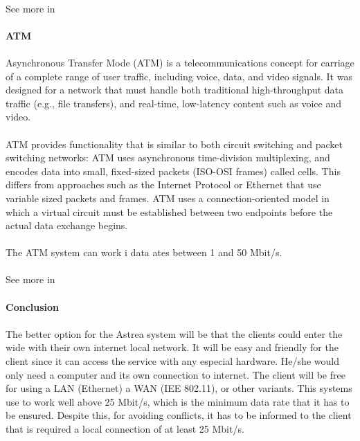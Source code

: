 \paragraph{}
See more in \cite{FrameRelay}

\paragraph{} \textbf{ATM}
\paragraph{} 
Asynchronous Transfer Mode (ATM) is a telecommunications concept for carriage of a complete range of user traffic, including voice, data, and video signals. It was designed for a network that must handle both traditional high-throughput data traffic (e.g., file transfers), and real-time, low-latency content such as voice and video. 
\paragraph{}
ATM provides functionality that is similar to both circuit switching and packet switching networks: ATM uses asynchronous time-division multiplexing, and encodes data into small, fixed-sized packets (ISO-OSI frames) called cells. This differs from approaches such as the Internet Protocol or Ethernet that use variable sized packets and frames. ATM uses a connection-oriented model in which a virtual circuit must be established between two endpoints before the actual data exchange begins.
\paragraph{}
The ATM system can work i data ates between 1 and 50 Mbit/s.
\paragraph{}
See more in \cite{ATM}

\paragraph{} \textbf{Conclusion}
\paragraph{}
The better option for the Astrea system will be that the clients could enter the wide with their own internet local network. It will be easy and friendly for the client since it can access the service with any especial hardware. He/she would only need a computer and its own connection to internet. The client will be free for using a LAN (Ethernet) a WAN (IEE 802.11), or other variants. This systems use to work well above 25 Mbit/s, which is the minimum data rate that it has to be ensured. Despite this, for avoiding conflicts, it has to be informed to the client that is required a local connection of at least 25 Mbit/s.
